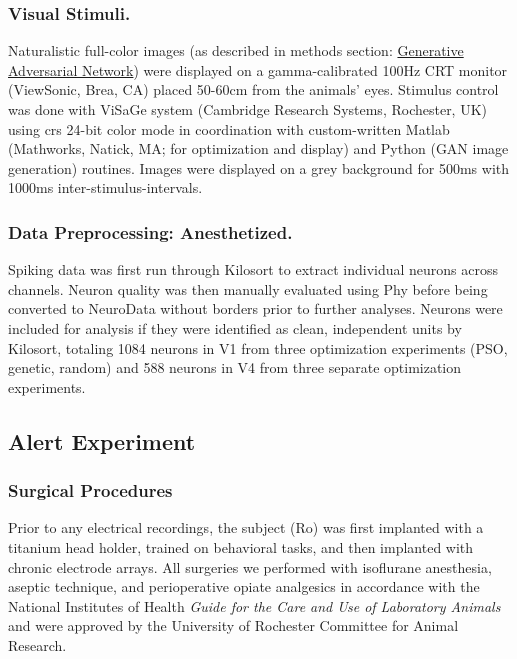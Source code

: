\subsubsection*{Visual Stimuli.}
Naturalistic full-color images (as described in methods section: \hyperref[{methods:gan}]{Generative Adversarial Network}) were displayed on a gamma-calibrated 100Hz CRT monitor (ViewSonic, Brea, CA) placed 50-60cm from the animals' eyes. Stimulus control was done with ViSaGe system (Cambridge Research Systems, Rochester, UK) using crs 24-bit color mode in coordination with custom-written Matlab (Mathworks, Natick, MA; for optimization and display) and Python (GAN image generation) routines. Images were displayed on a grey background for 500ms with 1000ms inter-stimulus-intervals. 

\subsubsection*{Data Preprocessing: Anesthetized.}
Spiking data was first run through Kilosort \parencite{Steinmetz2021} to extract individual neurons across channels. Neuron quality was then manually evaluated using Phy before being converted to NeuroData without borders prior to further analyses. Neurons were included for analysis if they were identified as clean, independent units by Kilosort, totaling 1084 neurons in V1 from three optimization experiments (PSO, genetic, random) and 588 neurons in V4 from three separate optimization experiments. 


\subsection*{Alert Experiment}

\subsubsection*{Surgical Procedures}
Prior to any electrical recordings, the subject (Ro) was first implanted with a titanium head holder, trained on behavioral tasks, and then implanted with chronic electrode arrays. All surgeries we performed with isoflurane anesthesia, aseptic technique, and perioperative opiate analgesics in accordance with the National Institutes of Health \textit{Guide for the Care and Use of Laboratory Animals} and were approved by the University of Rochester Committee for Animal Research.

